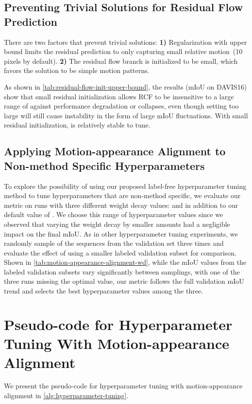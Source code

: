 
\subsection{Preventing Trivial Solutions for Residual Flow Prediction}
There are two factors that prevent trivial solutions: \textbf{1)} Regularization with upper bound  limits the residual prediction to only capturing small relative motion~(10 pixels by default). \textbf{2)} The residual flow branch is initialized to be small, which favors the solution to be simple motion patterns.

As shown in \cref{tab:residual-flow-init-upper-bound}, the results (mIoU on DAVIS16) show that small residual initialization allows RCF to be insensitive to a large range of  against performance degradation or {\color{red}collapses}, even though setting  too large will still cause instability in the form of large mIoU fluctuations. With small residual initialization,  is relatively stable to tune. 

\subsection{Applying Motion-appearance Alignment to Non-method Specific Hyperparameters}
To explore the possibility of using our proposed label-free hyperparameter tuning method to tune hyperparameters that are non-method specific, we evaluate our metric on runs with three different weight decay values:  and  in addition to our default value of . We choose this range of hyperparameter values since we observed that varying the weight decay by smaller amounts had a negligible impact on the final mIoU. As in other hyperparameter tuning experiments, we randomly sample  of the sequences from the validation set three times and evaluate the effect of using a smaller labeled validation subset for comparison. Shown in \cref{tab:motion-appearance-alignment-wd}, while the mIoU values from the labeled validation subsets vary significantly between samplings, with one of the three runs missing the optimal value, our metric follows the full validation mIoU trend and selects the best hyperparameter values among the three.


\section{Pseudo-code for Hyperparameter Tuning With Motion-appearance Alignment}
We present the pseudo-code for hyperparameter tuning with motion-appearance alignment in \cref{alg:hyperparameter-tuning}.

